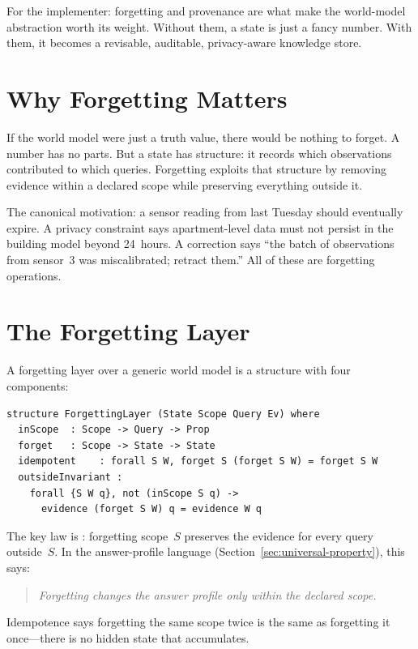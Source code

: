 \documentclass[11pt,openany]{report}
\begin{document}
For the implementer: forgetting and provenance are what make the
world-model abstraction worth its weight.  Without them, a state is just
a fancy number.  With them, it becomes a revisable, auditable, privacy-aware
knowledge store.

\section{Why Forgetting Matters}

If the world model were just a truth value, there would be nothing to
forget.  A number has no parts.  But a state has structure: it records
which observations contributed to which queries.  Forgetting exploits
that structure by removing evidence within a declared scope while
preserving everything outside it.

The canonical motivation: a sensor reading from last Tuesday should
eventually expire.  A privacy constraint says apartment-level data
must not persist in the building model beyond 24~hours.  A correction
says ``the batch of observations from sensor~3 was miscalibrated;
retract them.''  All of these are forgetting operations.

\section{The Forgetting Layer}
\label{sec:forgetting}

A forgetting layer over a generic world model is a structure with four
components:

\begin{lstlisting}
structure ForgettingLayer (State Scope Query Ev) where
  inScope  : Scope -> Query -> Prop
  forget   : Scope -> State -> State
  idempotent    : forall S W, forget S (forget S W) = forget S W
  outsideInvariant :
    forall {S W q}, not (inScope S q) ->
      evidence (forget S W) q = evidence W q
\end{lstlisting}

\noindent
The key law is : forgetting scope~$S$ preserves
the evidence for every query outside~$S$.  In the answer-profile
language (Section~\ref{sec:universal-property}), this says:

\begin{quote}
\emph{Forgetting changes the answer profile only within the declared scope.}
\end{quote}

\noindent
Idempotence says forgetting the same scope twice is the same as
forgetting it once---there is no hidden state that accumulates.
\end{document}
